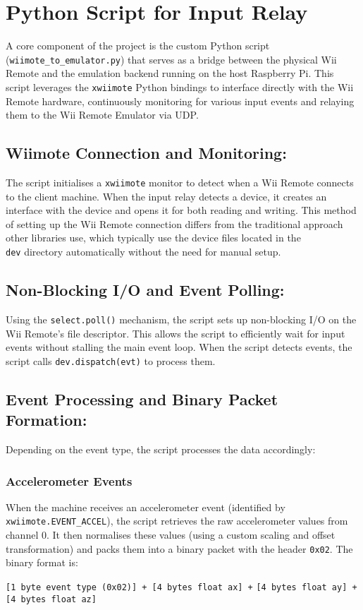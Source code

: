 \section{Python Script for Input Relay}
A core component of the project is the custom Python script
(\texttt{wiimote\_to\_emulator.py}) that serves as a bridge between the physical
Wii Remote and the emulation backend running on the host Raspberry Pi. This
script leverages the \texttt{xwiimote} Python bindings to interface directly
with the Wii Remote hardware, continuously monitoring for various input events
and relaying them to the Wii Remote Emulator via UDP.

\subsection{Wiimote Connection and Monitoring:}
The script initialises a \texttt{xwiimote} monitor to detect when a Wii Remote connects to the client machine. When the input relay detects a device, it creates an interface with the device and opens it for both reading and writing. This method of setting up the Wii Remote connection differs from the traditional approach other libraries use, which typically use the device files located in the \texttt{\\dev} directory automatically without the need for manual setup.

\subsection{Non-Blocking I/O and Event Polling:}
Using the \texttt{select.poll()} mechanism, the script sets up non-blocking I/O on the Wii Remote’s file descriptor. This allows the script to efficiently wait for input events without stalling the main event loop. When the script detects events, the script calls \texttt{dev.dispatch(evt)} to process them.

\subsection{Event Processing and Binary Packet Formation:}
Depending on the event type, the script processes the data accordingly:

\subsubsection{Accelerometer Events}
When the machine receives an accelerometer event (identified by \texttt{xwiimote.EVENT\_ACCEL}), the script retrieves the raw accelerometer values from channel 0. It then normalises these values (using a custom scaling and offset transformation) and packs them into a binary packet with the header \texttt{0x02}. The binary format is:
\begin{center}
	\texttt{[1 byte event type (0x02)] + [4 bytes float ax] +}
	\texttt{[4 bytes float ay] + [4 bytes float az]}
\end{center}

